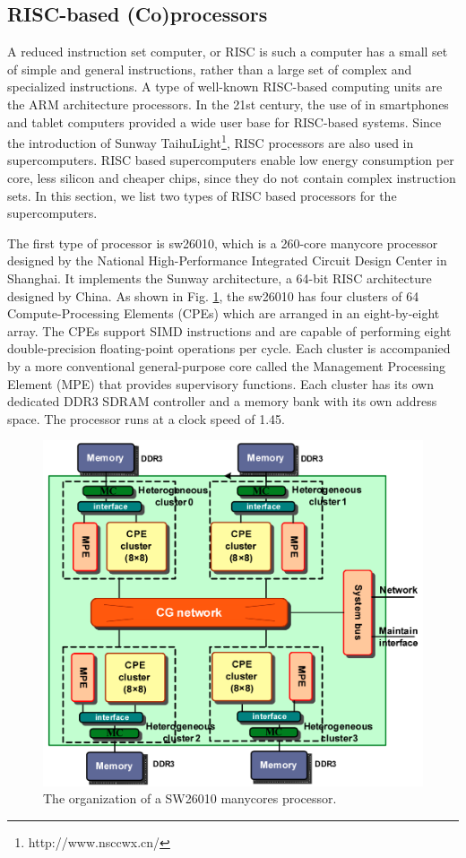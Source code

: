 \subsection{RISC-based (Co)processors}

A reduced instruction set computer, or RISC  is such a computer has a small set of simple and general instructions, rather than a large set of complex and specialized instructions. A type of well-known RISC-based computing units are the ARM architecture processors. In the 21st century, the use of in smartphones and tablet computers provided a wide user base for RISC-based systems. Since the introduction of Sunway TaihuLight\footnote{http://www.nsccwx.cn/}, RISC processors are also used in supercomputers. RISC based supercomputers enable low energy consumption per core, less silicon and cheaper chips, since they do not contain complex instruction sets. In this section, we list two types of RISC based processors for the supercomputers.

The first type of processor is sw26010, which is a 260-core manycore processor \cite{fu2016sunway} designed by the National High-Performance Integrated Circuit Design Center in Shanghai. It implements the Sunway architecture, a 64-bit RISC architecture designed by China. As shown in Fig. \ref{fig:sw26010}, the sw26010 has four clusters of 64 Compute-Processing Elements (CPEs) which are arranged in an eight-by-eight array. The CPEs support SIMD instructions and are capable of performing eight double-precision floating-point operations per cycle. Each cluster is accompanied by a more conventional general-purpose core called the Management Processing Element (MPE) that provides supervisory functions. Each cluster has its own dedicated DDR3 SDRAM controller and a memory bank with its own address space. The processor runs at a clock speed of 1.45.

\begin{figure}[htbp]
	\centering
	\includegraphics[width=4.6in]{fig/sw26010.png}
	\caption{The organization of a SW26010 manycores processor.}
	\label{fig:sw26010}
\end{figure}


